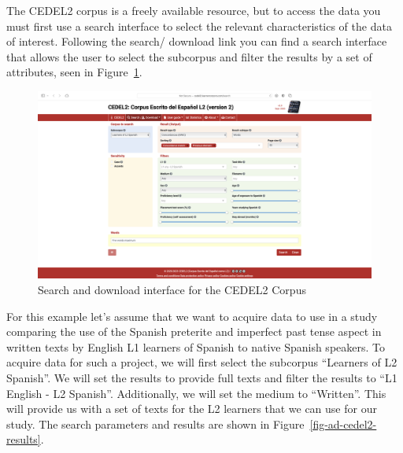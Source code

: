 \documentclass[
  letterpaper,
  DIV=11,
  numbers=noendperiod]{scrreport}
\theoremstyle{definition}
\theoremstyle{remark}
\begin{document}
The CEDEL2 corpus is a freely available resource, but to access the data
you must first use a search interface to select the relevant
characteristics of the data of interest. Following the search/ download
link you can find a search interface that allows the user to select the
subcorpus and filter the results by a set of attributes, seen in
Figure~\ref{fig-ad-cedel2-search}.

\begin{figure}[H]

{\centering \includegraphics[width=1\textwidth,height=\textheight]{figures/ad-cedel2-search.png}

}

\caption{\label{fig-ad-cedel2-search}Search and download interface for
the CEDEL2 Corpus}

\end{figure}

For this example let's assume that we want to acquire data to use in a
study comparing the use of the Spanish preterite and imperfect past
tense aspect in written texts by English L1 learners of Spanish to
native Spanish speakers. To acquire data for such a project, we will
first select the subcorpus ``Learners of L2 Spanish''. We will set the
results to provide full texts and filter the results to ``L1 English -
L2 Spanish''. Additionally, we will set the medium to ``Written''. This
will provide us with a set of texts for the L2 learners that we can use
for our study. The search parameters and results are shown in
Figure~\ref{fig-ad-cedel2-results}.
\end{document}
